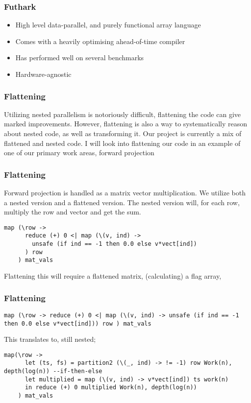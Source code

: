 \documentclass{beamer}
\begin{document}
 \begin{frame}
 \frametitle{Futhark}
 \begin{itemize}
\item{High level data-parallel, and purely functional array language}
\item{Comes with a heavily optimising ahead-of-time compiler}
\item{Has performed well on several benchmarks}
\item{Hardware-agnostic}
\end{itemize}
\end{frame}

\begin{frame}
  \frametitle{Flattening}
  Utilizing nested parallelism is notoriously difficult, flattening the code can give marked improvements. However, flattening is also a way to systematically reason about nested code, as well as transforming it. Our project is currently a mix of flattened and nested code.\newline
  \newline
  I will look into flattening our code in an example of one of our primary work areas, forward projection
\end{frame}

\begin{frame}[fragile]
  \frametitle{Flattening}
  Forward projection is handled as a matrix vector multiplication. We utilize both a nested version and a flattened version. %
  The nested version will, for each row, multiply the row and vector and get the sum.
  \begin{lstlisting}[frame=single, language=Futhark]
    map (\row ->
      reduce (+) 0 <| map (\(v, ind) ->
        unsafe (if ind == -1 then 0.0 else v*vect[ind])
      ) row
    ) mat_vals
  \end{lstlisting}
  Flattening this will require a flattened matrix, (calculating) a flag array,
\end{frame}

\begin{frame}[fragile]
  \frametitle{Flattening}
  \begin{lstlisting}[frame=single, language=Futhark]
    map (\row -> reduce (+) 0 <| map (\(v, ind) -> unsafe (if ind == -1 then 0.0 else v*vect[ind])) row ) mat_vals
  \end{lstlisting}
  This translates to, still nested;
  \begin{lstlisting}[frame=single, language=Futhark]
    map(\row ->
      let (ts, fs) = partition2 (\(_, ind) -> != -1) row Work(n), depth(log(n)) --if-then-else
      let multiplied = map (\(v, ind) -> v*vect[ind]) ts work(n)
      in reduce (+) 0 multiplied Work(n), depth(log(n))
    ) mat_vals
  \end{lstlisting}
\end{frame}
\end{document}
